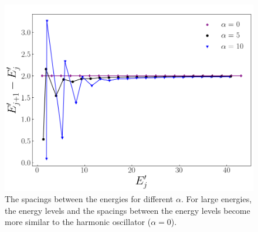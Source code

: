 \documentclass[twocolumn]{article}
\begin{document}
\begin{large}
\begin{figure}
    \centering
    \includegraphics[scale=0.35]{relationship.png}
    \caption{The spacings between the energies for different $\alpha$. For large energies, the energy levels and the spacings between the energy levels become more similar to the harmonic oscillator ($\alpha=0$).}
    \label{4apr2044}
\end{figure}

\end{large}
\end{document}
